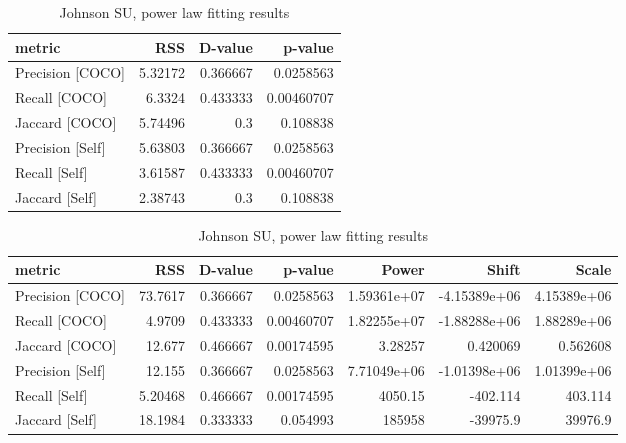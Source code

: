 \documentclass[12pt]{article}
\begin{document}
\begin{table}[h]
\centering
\begin{tabular}{lrrr}
\hline
 metric           &     RSS &   D-value &    p-value \\
\hline
 Precision [COCO] & 5.32172 &  0.366667 & 0.0258563  \\
 Recall [COCO]    & 6.3324  &  0.433333 & 0.00460707 \\
 Jaccard [COCO]   & 5.74496 &  0.3      & 0.108838   \\
 Precision [Self] & 5.63803 &  0.366667 & 0.0258563  \\
 Recall [Self]    & 3.61587 &  0.433333 & 0.00460707 \\
 Jaccard [Self]   & 2.38743 &  0.3      & 0.108838   \\
\hline
\end{tabular}

\begin{tabular}{lrrrrrr}
\hline
 metric           &      RSS &   D-value &    p-value &            Power &            Shift &           Scale \\
\hline
 Precision [COCO] & 73.7617  &  0.366667 & 0.0258563  &      1.59361e+07 &     -4.15389e+06 &     4.15389e+06 \\
 Recall [COCO]    &  4.9709  &  0.433333 & 0.00460707 &      1.82255e+07 &     -1.88288e+06 &     1.88289e+06 \\
 Jaccard [COCO]   & 12.677   &  0.466667 & 0.00174595 &      3.28257     &      0.420069    &     0.562608    \\
 Precision [Self] & 12.155   &  0.366667 & 0.0258563  &      7.71049e+06 &     -1.01398e+06 &     1.01399e+06 \\
 Recall [Self]    &  5.20468 &  0.466667 & 0.00174595 &   4050.15        &   -402.114       &   403.114       \\
 Jaccard [Self]   & 18.1984  &  0.333333 & 0.054993   & 185958           & -39975.9         & 39976.9         \\
\hline
\end{tabular}
\caption{Johnson SU, power law fitting results}
\label{jsu_tbl}
\end{table}
\end{document}
